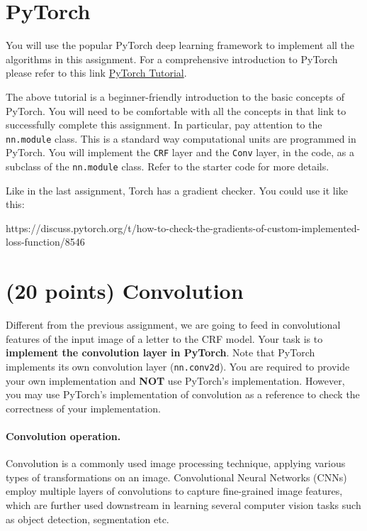 \documentclass[11pt]{report}
\begin{document}
\section{PyTorch}
\label{sec:PyTorch}
You will use the popular PyTorch deep learning framework to implement all the
algorithms in this assignment. For a comprehensive introduction to PyTorch
please refer to this link
\href{https://pytorch.org/tutorials/beginner/pytorch_with_examples.html}{PyTorch
  Tutorial}.

The above tutorial is a beginner-friendly introduction to the basic concepts of
PyTorch. You will need to be comfortable with all the concepts in that link to
successfully complete this assignment. In particular, pay attention to the
\texttt{nn.module} class. This is a standard way computational units are
programmed in PyTorch. You will implement the \texttt{CRF} layer and the
\texttt{Conv} layer, in the code, as a subclass of the \texttt{nn.module} class.
Refer to the starter code for more details.

Like in the last assignment, Torch has a gradient checker. 
You could use it like this:

https://discuss.pytorch.org/t/how-to-check-the-gradients-of-custom-implemented-loss-function/8546

\section{(20 points) Convolution}

Different from the previous assignment, we are going to feed in convolutional
features of the input image of a letter to the CRF model. Your task is to
\textbf{implement the convolution layer in PyTorch}. Note that PyTorch
implements its own convolution layer (\texttt{nn.conv2d}). You are required to
provide your own implementation and \textbf{NOT} use PyTorch's implementation.
However, you may use PyTorch's implementation of convolution as a reference to
check the correctness of your implementation.

\paragraph{Convolution operation.} \label{par:question1}
\label{par:Convolution}

Convolution is a commonly used image processing technique, applying various
types of transformations on an image. Convolutional Neural Networks (CNNs)
employ multiple layers of convolutions to capture fine-grained image features,
which are further used downstream in learning several computer vision tasks such
as object detection, segmentation etc.
\end{document}
